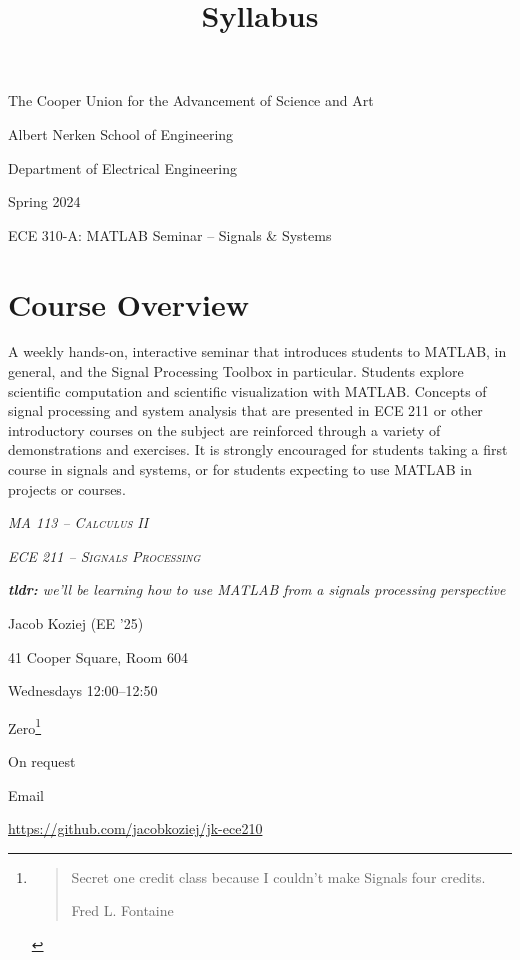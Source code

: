 \documentclass{article}
\title{Syllabus}
\begin{document}
\renderTitle

\scshape
\slshape

\begin{Centering}
\noindent
The Cooper Union for the Advancement of Science and Art

\noindent
Albert Nerken School of Engineering

\noindent
Department of Electrical Engineering

\noindent
Spring 2024

\leavevmode
\newline

\noindent
ECE 310-A: MATLAB Seminar -- Signals \& Systems

\end{Centering}

\normalfont

\section{Course Overview}


\begin{displayquote}
	A weekly hands-on, interactive seminar that introduces students
	to MATLAB, in general, and the Signal Processing Toolbox in
	particular.  Students explore scientific computation and
	scientific visualization with MATLAB.  Concepts of signal
	processing and system analysis that are presented in ECE 211 or
	other introductory courses on the subject are reinforced through
	a variety of demonstrations and exercises.  It is strongly
	encouraged for students taking a first course in signals and
	systems, or for students expecting to use MATLAB in projects or
	courses.

	\footnotesize

	\noindent
	 \textsc{\textsl{MA 113 -- Calculus II}}

	\noindent
	 \textsc{\textsl{ECE 211 -- Signals
	Processing}}

	\noindent
	\textsl{\textbf{tldr:} we'll be learning how to use MATLAB from
	a signals processing perspective}
\end{displayquote}

\noindent
{} Jacob Koziej (EE '25)

\noindent
{} 41 Cooper Square, Room 604

\noindent
{} Wednesdays 12:00--12:50

\noindent
{} Zero\footnote{\blockquote[Fred L. Fontaine]{Secret one
credit class because I couldn't make Signals four credits.}}

\noindent
{} On request

\noindent
{} Email

\noindent
{} \url{https://github.com/jacobkoziej/jk-ece210}
\end{document}
